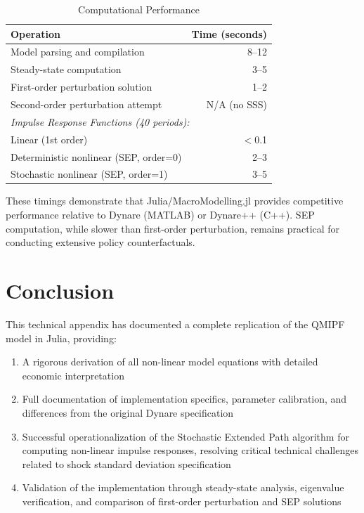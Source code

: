 \documentclass[12pt]{article}
\begin{document}
\begin{table}[H]
\centering
\caption{Computational Performance}\label{tab:performance}
\begin{tabular}{lr}
\toprule
\textbf{Operation} & \textbf{Time (seconds)} \\
\midrule
Model parsing and compilation & 8--12 \\
Steady-state computation & 3--5 \\
First-order perturbation solution & 1--2 \\
Second-order perturbation attempt & N/A (no SSS) \\
\midrule
\multicolumn{2}{l}{\textit{Impulse Response Functions (40 periods):}} \\
\quad Linear (1st order) & $<$0.1 \\
\quad Deterministic nonlinear (SEP, order=0) & 2--3 \\
\quad Stochastic nonlinear (SEP, order=1) & 3--5 \\
\bottomrule
\end{tabular}
\end{table}

These timings demonstrate that Julia/MacroModelling.jl provides competitive performance relative to Dynare (MATLAB) or Dynare++ (C++). SEP computation, while slower than first-order perturbation, remains practical for conducting extensive policy counterfactuals.

\section{Conclusion}\label{sec:conclusion}

This technical appendix has documented a complete replication of the QMIPF model in Julia, providing:
\begin{enumerate}
\item A rigorous derivation of all non-linear model equations with detailed economic interpretation
\item Full documentation of implementation specifics, parameter calibration, and differences from the original Dynare specification
\item Successful operationalization of the Stochastic Extended Path algorithm for computing non-linear impulse responses, resolving critical technical challenges related to shock standard deviation specification
\item Validation of the implementation through steady-state analysis, eigenvalue verification, and comparison of first-order perturbation and SEP solutions
\end{enumerate}
\end{document}
